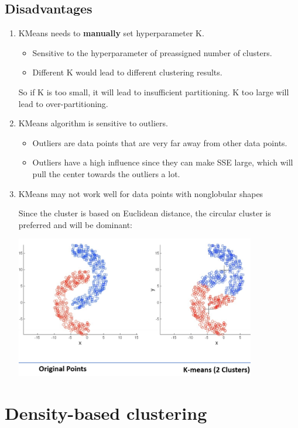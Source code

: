 \documentclass[letterpaper,12pt]{article}
\begin{document}
\subsection{Disadvantages}
\begin{enumerate}
    \item K\-Means needs to \textbf{manually} set hyper\-parameter K.
    \begin{itemize}
        \item Sensitive to the hyper\-parameter of pre\-assigned number of clusters.
        \item Different K would lead to different clustering results.
    \end{itemize}
    So if K is too small, it will lead to insufficient partitioning. K too large will lead to over-partitioning.
    \item K\-Means algorithm is sensitive to outliers.
    \begin{itemize}
        \item Outliers are data points that are very far away from other data points.
        \item Outliers have a high influence since they can make SSE large, which will pull the center towards the outliers a lot.
    \end{itemize}
    \item K\-Means may not work well for data points with non\-globular shapes
    
    Since the cluster is based on Euclidean distance, the circular cluster is preferred and will be dominant:

    \includegraphics{Image/K means comparison unglobular shape.png}
\end{enumerate}

\section{Density-based clustering}
\end{document}
